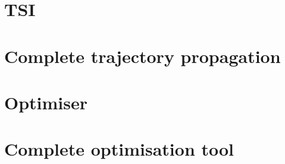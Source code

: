 \section{\acl{TSI}}
\label{sec:tsiverval}

\section{Complete trajectory propagation}
\label{sec:propverval}



\section{Optimiser}
\label{sec:optver}


\section{Complete optimisation tool}
\label{sec:opttoolverval}


